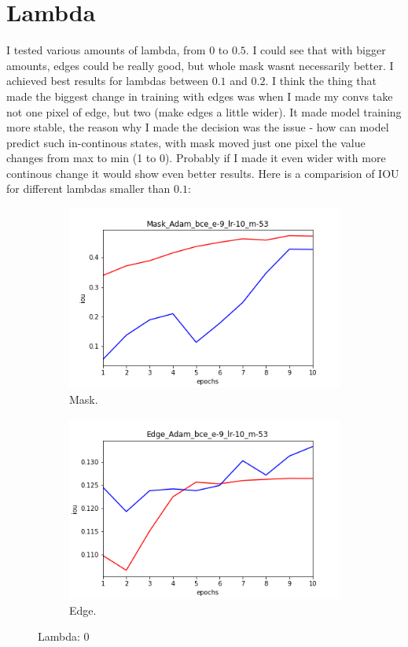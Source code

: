 \documentclass[a4paper]{article}
\begin{document}
\section{Lambda}
I tested various amounts of lambda, from $0$ to $0.5$. I could see that with bigger amounts, edges could
be really good, but whole mask wasnt necessarily better. I achieved best results for lambdas between $0.1$
and $0.2$. I think the thing that made the biggest change in training with edges was when I made my convs
take not one pixel of edge, but two (make edges a little wider). It made model training more stable,
the reason why I made the decision was the issue - how can model predict such in-continous states, with
mask moved just one pixel the value changes from max to min (1 to 0). Probably if I made it even wider
with more continous change it would show even better results.
\newpage
Here is a comparision of IOU for different lambdas smaller than $0.1$:
\begin{figure}[h]
    \centering
    \begin{subfigure}[b]{0.45\textwidth}
        \includegraphics[width=\textwidth]{imgs/lambda/0/Mask_Adam_bce_e-9_lr-10_m-53_13_May_2022-22:17.png}
        \caption{Mask.}
    \end{subfigure}
    \hfill
    \begin{subfigure}[b]{0.45\textwidth}
        \includegraphics[width=\textwidth]{imgs/lambda/0/Edge_Adam_bce_e-9_lr-10_m-53_13_May_2022-22:17.png}
        \caption{Edge.}
    \end{subfigure}
    \caption{Lambda: 0}
\end{figure}
\end{document}
